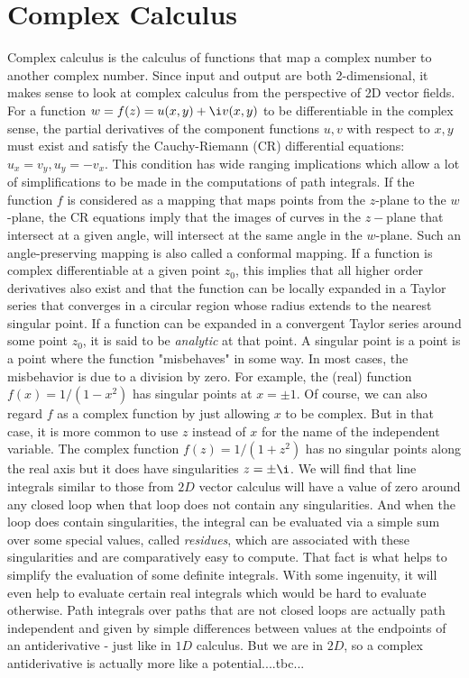 \section{Complex Calculus}
Complex calculus is the calculus of functions that map a complex number to another complex number. Since input and output are both 2-dimensional, it makes sense to look at complex calculus from the perspective of 2D vector fields. For a function $w = f(z) = u(x,y) + \i v(x,y)$ to be differentiable in the complex sense, the partial derivatives of the component functions $u,v$ with respect to $x,y$ must exist and satisfy the Cauchy-Riemann (CR) differential equations: $u_x = v_y, u_y = -v_x$. This condition has wide ranging implications which allow a lot of simplifications to be made in the computations of path integrals. If the function $f$ is considered as a mapping that maps points from the $z$-plane to the $w$-plane, the CR equations imply that the images of curves in the $z-$plane that intersect at a given angle, will intersect at the same angle in the $w$-plane. Such an angle-preserving mapping is also called a conformal mapping. If a function is complex differentiable at a given point $z_0$, this implies that all higher order derivatives also exist and that the function can be locally expanded in a Taylor series that converges in a circular region whose radius extends to the nearest singular point. If a function can be expanded in a convergent Taylor series around some point $z_0$, it is said to be \emph{analytic} at that point. A singular point is a point is a point where the function "misbehaves" in some way. In most cases, the misbehavior is due to a division by zero. For example, the (real) function $f(x) = 1 / (1 - x^2)$ has singular points at $x = \pm 1$. Of course, we can also regard $f$ as a complex function by just allowing $x$ to be complex. But in that case, it is more common to use $z$ instead of $x$ for the name of the independent variable. The complex function $f(z) = 1 / (1 + z^2)$ has no singular points along the real axis but it does have singularities $z = \pm \i$. We will find that line integrals similar to those from $2D$ vector calculus will have a value of zero around any closed loop when that loop does not contain any singularities. And when the loop does contain singularities, the integral can be evaluated via a simple sum over some special values, called \emph{residues}, which are associated with these singularities and are comparatively easy to compute. That fact is what helps to simplify the evaluation of some definite integrals. With some ingenuity, it will even help to evaluate certain real integrals which would be hard to evaluate otherwise. Path integrals over paths that are not closed loops are actually path independent and given by simple differences between values at the endpoints of an antiderivative - just like in $1D$ calculus. But we are in $2D$, so a complex antiderivative is actually more like a potential....tbc...


